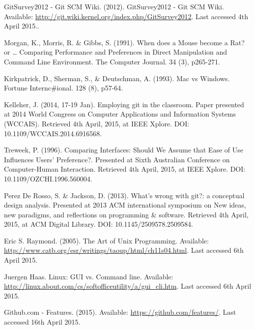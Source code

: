 \documentclass[a4paper,oneside]{bth} %
\begin{document}
		\newpage
		\begin{thebibliography}{1}
			
			GitSurvey2012 - Git SCM Wiki. (2012). GitSurvey2012 - Git SCM Wiki. Available: \url{http://git.wiki.kernel.org/index.php/GitSurvey2012}. Last accessed 4th April 2015..
			
			Morgan, K., Morris, R. \& Gibbs, S. (1991). When does a Mouse become a Rat? or … Comparing Performance and Preferences in Direct Manipulation and Command Line Environment. The Computer Journal. 34 (3), p265-271.
			
			Kirkpatrick, D., Sherman, S., \& Deutschman, A. (1993). Mac vs Windows. Fortune Internc\#ional. 128 (8), p57-64.
			
			Kelleher, J. (2014, 17-19 Jan). Employing git in the classroom. Paper presented at 2014 World Congress on Computer Applications and Information Systems (WCCAIS). Retrieved 4th April, 2015, at IEEE Xplore. DOI: 10.1109/WCCAIS.2014.6916568.
			
			Treweek, P. (1996). Comparing Interfaces: Should We Assume that Ease of Use Influences Users' Preference?. Presented at Sixth Australian Conference on Computer-Human Interaction. Retrieved 4th April, 2015, at IEEE Xplore. DOI: 10.1109/OZCHI.1996.560004.
			
			
			Perez De Rosso, S. \& Jackson, D. (2013). What's wrong with git?: a conceptual design analysis. Presented at 2013 ACM international symposium on New ideas, new paradigms, and reflections on programming \& software. Retrieved 4th April, 2015, at ACM Digital Library. DOI: 10.1145/2509578.2509584.
			
			Eric S. Raymond. (2005). The Art of Unix Programming.
			Available: \url{http://www.catb.org/esr/writings/taoup/html/ch11s04.html}.
			Last accessed 6th April 2015.
			
			Juergen Haas. Linux: GUI vs. Command line. Available: \url{http://linux.about.com/cs/softofficeutility/a/gui\_cli.htm}. Last accessed 6th April 2015.
			
			Github.com - Features. (2015). Available: \url{https://github.com/features/}. Last accessed 16th April 2015.
			

\end{thebibliography}
\end{document}

